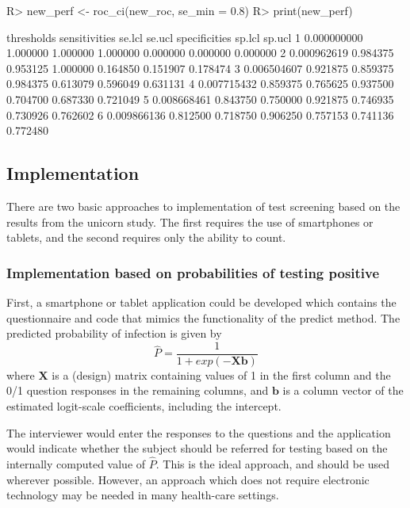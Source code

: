 \documentclass[11pt]{report}
\renewenvironment{Schunk}{\vspace{\topsep}}{\vspace{\topsep}}
\begin{document}
\begin{Schunk}
\begin{Sinput}
R> new_perf <- roc_ci(new_roc, se_min = 0.8)
R> print(new_perf)
\end{Sinput}
\begin{Soutput}
   thresholds sensitivities   se.lcl   se.ucl specificities   sp.lcl   sp.ucl
1 0.000000000      1.000000 1.000000 1.000000      0.000000 0.000000 0.000000
2 0.000962619      0.984375 0.953125 1.000000      0.164850 0.151907 0.178474
3 0.006504607      0.921875 0.859375 0.984375      0.613079 0.596049 0.631131
4 0.007715432      0.859375 0.765625 0.937500      0.704700 0.687330 0.721049
5 0.008668461      0.843750 0.750000 0.921875      0.746935 0.730926 0.762602
6 0.009866136      0.812500 0.718750 0.906250      0.757153 0.741136 0.772480
\end{Soutput}
\end{Schunk}

\subsection*{Implementation}

There are two basic approaches to implementation of test screening
based on the results from the unicorn study.  The first requires the use of
smartphones or tablets, and the second requires only the ability to count.

\subsubsection*{Implementation based on probabilities of testing positive}

First, a smartphone or tablet application could be developed which
contains the questionnaire and code that mimics the functionality of
the \textsf{predict} method.  The predicted probability of infection is given
by
\[\hat{P} = \frac{1}{1 + exp(-\mathbf{Xb})}\] where $\mathbf{X}$ is a
(design) matrix containing values of 1 in the first column and the 0/1
question responses in the remaining columns, and $\mathbf{b}$ is a
column vector of the estimated logit-scale coefficients, including the
intercept.

The interviewer would enter the responses to the questions and the
application would indicate whether the subject should be referred for
testing based on the internally computed value of $\hat{P}$. This is
the ideal approach, and should be used wherever possible. However, an
approach which does not require electronic technology may be needed in
many health-care settings.
\end{document}
